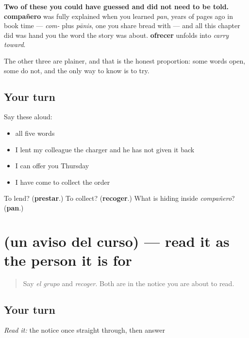\begin{grammarlens}[title={What you've built}]
\textbf{Two of these you could have guessed and did not need to be told.} \textbf{compañero} was fully explained when you learned \emph{pan}, years of pages ago in book time — \emph{com-} plus \emph{pānis}, one you share bread with — and all this chapter did was hand you the word the story was about. \textbf{ofrecer} unfolds into \emph{carry toward}.

The other three are plainer, and that is the honest proportion: some words open, some do not, and the only way to know is to try.
\end{grammarlens}

\subsection*{Your turn}
Say these aloud:

\begin{itemize}
\raggedright
  \item all five words
  \item I lent my colleague the charger and he has not given it back
  \item I can offer you Thursday
  \item I have come to collect the order
\end{itemize}

\begin{tcolorbox}[breakable,colback=teal!4,colframe=teal!35!black,title={Before you move on}]
To lend? (\textbf{prestar}.) To collect? (\textbf{recoger}.) What is hiding inside \emph{compañero}? (\textbf{pan}.)
\end{tcolorbox}
\section[Practice]{(un aviso del curso) — read it as the person it is for}

\label{lesson:ES-C436-sintesis-aviso-grupo}



\begin{quote}
Say \emph{el grupo} and \emph{recoger}. Both are in the notice you are about to read.
\end{quote}

\subsection*{Your turn}
\emph{Read it:} the notice once straight through, then answer

